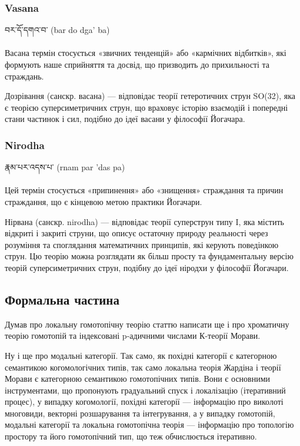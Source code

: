 \subsubsection*{Vasana}

\ti བར་དོ་དགའ་བ་  \ua (bar do dga' ba)\\
\\
Васана термін стосується «звичних тенденцій» або «кармічних відбитків»,
які формують наше сприйняття та досвід, що призводить до прихильності та страждань.

Дозрівання (санскр. васана) --- відповідає теорії гетеротичних струн SO(32),
яка є теорією суперсиметричних струн, що враховує історію взаємодій і попередні
стани частинок і сил, подібно до ідеї васани у філософії Йогачара.

\newpage
\subsubsection*{Nirodha}

\ti རྣམ་པར་འདས་པ་  \ua (rnam par 'das pa)\\
\\
Цей термін стосується «припинення» або «знищення» страждання та причин страждання,
що є кінцевою метою практики Йогачари.

Нірвана (санскр. nirodha) --- відповідає теорії суперструн типу I,
яка містить відкриті і закриті струни, що описує остаточну природу реальності
через розуміння та споглядання математичних принципів, які керують поведінкою
струн. Цю теорію можна розглядати як більш просту та фундаментальну версію
теорій суперсиметричних струн, подібну до ідеї ніродхи у філософії Йогачари.

\subsection*{Формальна частина}

Думав про локальну гомотопічну теорію статтю написати ще і про
хроматичну теорію гомотопій та індексовані p-адичними числами К-теорії Морави.

Ну і ще про модальні категорії. Так само, як похідні категорії
є категорною семантикою когомологічних типів, так само локальна
теорія Жардіна і теорії Морави є категорною семантикою гомотопічних
типів. Вони є основними інструментами, що пропонують градуальний
спуск і локалізацію (ітеративний процес), у випадку когомології,
похідні категорії --- інформацію про виколоті многовиди, векторні
розшарування та інтегрування, а у випадку гомотопій, модальні
категорії та локальна гомотопічна теорія --- інформацію про топологію
простору та його гомотопічний тип, що теж обчислюється ітеративно. 

